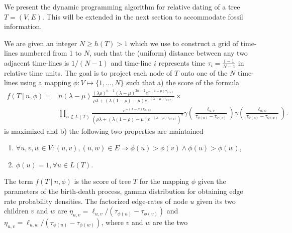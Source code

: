 \documentclass{llncs}
\begin{document}
We present the dynamic programming algorithm for relative dating of a tree
$T=(V,E)$. This will be extended in the next section to accommodate fossil
information.

We are given an integer $N \geq h(T) > 1$ which we use to construct a grid of
time-lines numbered from 1 to $N$, such that the (uniform) distance between any
two adjacent time-lines is $1 / (N-1)$ and time-line $i$ represents time
$\tau_i = \frac{i-1}{N-1}$ in relative time units. The goal is to project each node of
$T$ onto one of the $N$ time-lines using a mapping $\phi : V \mapsto
\{1,\ldots,N\}$ such that a) the score of the formula
%
%
\begin{equation}\label{eq:score}
\begin{split}
f(T\ |\ n,\phi) = & n (\lambda-\mu)
                    \frac {(\lambda\rho)^{n-1} (\lambda-\mu)^{2n-2}
                           e^{-(\lambda-\mu)\tau_{\phi(r)}}}
                          {\rho\lambda + 
                           (\lambda(1 -\rho)-\mu)
                           e^{-(\lambda-\mu)\tau_{\phi(r)}}} \times  \\
                  & \prod_{u\notin L(T)}\frac{e^{-(\lambda-\mu)\tau_{\phi(u)}}}
                                             {(\rho\lambda +
                                              (\lambda(1-\rho)-\mu)
                                              e^{-(\lambda-\mu)\tau_{\phi(u)}})^2}
                                        \gamma(\frac{\ell_{u,v}}{\tau_{\phi(u)}-\tau_{\phi(v)}})
                                        \gamma(\frac{\ell_{u,w}}{\tau_{\phi(u)}-\tau_{\phi(w)}}).
\end{split}
\end{equation}
%
%
is maximized and b) the following two properties are maintained
%
%
\begin{enumerate}
\item $\forall u,v,w \in V : (u,v), (u,w) \in E \Rightarrow \phi(u) > \phi(v)%
                                                     \wedge \phi(u) > \phi(w)$,
\item $\phi(u) = 1, \forall u \in L(T)$.
\end{enumerate}
%
%
The term $f(T\ |\ n,\phi)$ is the score of tree $T$ for the mapping $\phi$
given the parameters of the birth-death process, gamma distribution for
obtaining edge rate probability densities. The factorized edge-rates of node
$u$ given its two children $v$ and $w$ are $\eta_{u,v} =
\ell_{u,v}/(\tau_{\phi(u)} - \tau_{\phi(v)})$ and $\eta_{u,v} =
\ell_{u,w}/(\tau_{\phi(u)}-\tau_{\phi(w)})$, where $v$ and $w$ are the two
\end{document}

